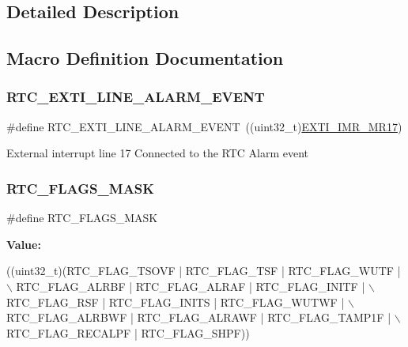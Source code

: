 \subsection{Detailed Description}


\subsection{Macro Definition Documentation}
\mbox{\label{group___r_t_c___private___constants_gaeffe9b89372b06df1c0eff2f4346682b}} 
\subsubsection{\texorpdfstring{R\+T\+C\+\_\+\+E\+X\+T\+I\+\_\+\+L\+I\+N\+E\+\_\+\+A\+L\+A\+R\+M\+\_\+\+E\+V\+E\+NT}{RTC\_EXTI\_LINE\_ALARM\_EVENT}}
{\footnotesize\ttfamily \#define R\+T\+C\+\_\+\+E\+X\+T\+I\+\_\+\+L\+I\+N\+E\+\_\+\+A\+L\+A\+R\+M\+\_\+\+E\+V\+E\+NT~((uint32\+\_\+t)\hyperlink{group___peripheral___registers___bits___definition_ga4489fa85d1552b8f40faed93483a5d35}{E\+X\+T\+I\+\_\+\+I\+M\+R\+\_\+\+M\+R17})}

External interrupt line 17 Connected to the R\+TC Alarm event \mbox{\label{group___r_t_c___private___constants_ga0c7513e50528d7b5a52e88340a4e7b25}} 
\subsubsection{\texorpdfstring{R\+T\+C\+\_\+\+F\+L\+A\+G\+S\+\_\+\+M\+A\+SK}{RTC\_FLAGS\_MASK}}
{\footnotesize\ttfamily \#define R\+T\+C\+\_\+\+F\+L\+A\+G\+S\+\_\+\+M\+A\+SK}

{\bfseries Value\+:}
\begin{DoxyCode}
((uint32\_t)(RTC\_FLAG\_TSOVF | RTC\_FLAG\_TSF | RTC\_FLAG\_WUTF | \(\backslash\)
                                            RTC\_FLAG\_ALRBF | RTC\_FLAG\_ALRAF | RTC\_FLAG\_INITF | \(\backslash\)
                                            RTC\_FLAG\_RSF | RTC\_FLAG\_INITS | RTC\_FLAG\_WUTWF | \(\backslash\)
                                            RTC\_FLAG\_ALRBWF | RTC\_FLAG\_ALRAWF | RTC\_FLAG\_TAMP1F | \(\backslash\)
                                            RTC\_FLAG\_RECALPF | RTC\_FLAG\_SHPF))
\end{DoxyCode}
